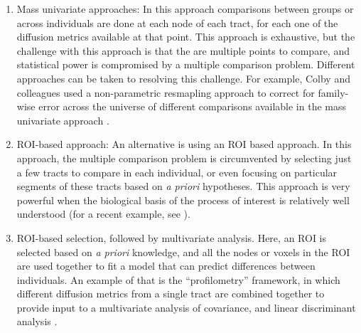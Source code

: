 \begin{enumerate}

\item Mass univariate approaches: In this approach comparisons between groups or
across individuals are done at each node of each tract, for each one of the
diffusion metrics available at that point. This approach is exhaustive, but the
challenge with this approach is that the are multiple points to compare, and
statistical power is compromised by a multiple comparison problem. Different
approaches can be taken to resolving this challenge. For example, Colby and
colleagues \cite{colby2012} used a non-parametric resmapling approach to correct
for family-wise error across the universe of different comparisons available in
the mass univariate approach \cite{Nichols2002-zu, Nichols2003-yy}.

\item ROI-based approach: An alternative is using an ROI based approach. In this
approach, the multiple comparison problem is circumvented by selecting just a
few tracts to compare in each individual, or even focusing on particular
segments of these tracts based on \emph{a priori} hypotheses. This approach is
very powerful when the biological basis of the process of interest is relatively
well understood (for a recent example, see \cite{huber2018rapid}).

\item ROI-based selection, followed by multivariate analysis. Here, an ROI is
selected based on \emph{a priori} knowledge, and all the nodes or voxels in the
ROI are used together to fit a model that can predict differences between
individuals. An example of that is the ``profilometry'' framework, in which
different diffusion metrics from a single tract are combined together to provide
input to a multivariate analysis of covariance, and linear discriminant analysis
\cite{dayan2016profilometry}.

\end{enumerate}

